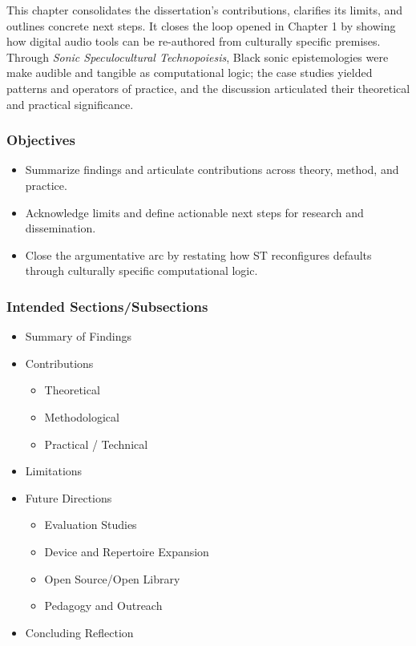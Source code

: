 

This chapter consolidates the dissertation’s contributions, clarifies its limits, and outlines concrete next steps. It closes the loop opened in Chapter 1 by showing how digital audio tools can be re-authored from culturally specific premises. Through \textit{Sonic Speculocultural Technopoiesis}, Black sonic epistemologies were make audible and tangible as computational logic; the case studies yielded patterns and operators of practice, and the discussion articulated their theoretical and practical significance.

\subsubsection{Objectives}
\begin{itemize}[nosep]
	\item Summarize findings and articulate contributions across theory, method, and practice.
	\item Acknowledge limits and define actionable next steps for research and dissemination.
	\item Close the argumentative arc by restating how ST reconfigures defaults through culturally specific computational logic.
\end{itemize}

\subsubsection{Intended Sections/Subsections}
\begin{itemize}[nosep]
	\item Summary of Findings
	\item Contributions
		\begin{itemize}[nosep]
			\item Theoretical
			\item Methodological
			\item Practical / Technical
		\end{itemize}
	\item Limitations
	\item Future Directions
		\begin{itemize}[nosep]
			\item Evaluation Studies
			\item Device and Repertoire Expansion
			\item Open Source/Open Library
			\item Pedagogy and Outreach
		\end{itemize}
	\item Concluding Reflection
\end{itemize}


